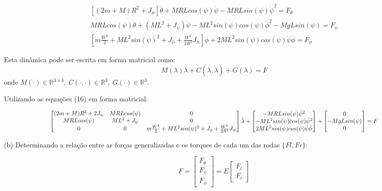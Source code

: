 \documentclass[10pt]{article}
\begin{document}
\begin{equation}
\begin{gathered}
    \left[(2m + M)R^2 + J_w\right] \ddot{\theta} + MRLcos(\psi)\ddot{\psi} - MRLsin(\psi)\dot{\psi}^2 = F_{\theta} \\
    MRLcos(\psi)\ddot{\theta} + (ML^2 + J_\psi)\ddot{\psi} - ML^2sin(\psi)cos(\psi)\dot{\phi}^2 - MgLsin(\psi) = F_{\psi} \\
    \left[m\frac{W^2}{2} + ML^2sin(\psi)^2 + J_{\phi} + \frac{W^2}{2R^2} J_w \right]\ddot{\phi} + 2ML^2sin(\psi)cos(\psi)\dot{\psi}\dot{\phi} = F_{\phi}
\end{gathered}
\end{equation}

\quad Esta dinâmica pode ser escrita em forma matricial como:
\begin{equation}
    M(\lambda) \ddot{\lambda} + C(\lambda, \dot{\lambda}) + G(\lambda) = F
\end{equation}
onde $M(\cdot) \in \mathbb{R}^{3 \times 3}, \ C(\cdot, \cdot) \in \mathbb{R}^3, \ G(\cdot) \in \mathbb{R}^3$.

\quad Utilizando as equações (16) em forma matricial:

\begin{equation}
    \scalebox{0.85}{$
    \begin{bmatrix}
        (2m + M)R^2 + 2J_w & MRLcos(\psi) & 0 \\
        MRLcos(\psi) & ML^2 + J_\psi & 0 \\
        0 & 0 & m\frac{W^2}{2}+ML^2sin(\psi)^2+J_{\phi}+\frac{W^2}{2R^2}J_w
    \end{bmatrix} \ddot{\lambda}+
    \begin{bmatrix}
        - MRLsin(\psi)\dot{\psi}^2 \\
        - ML^2sin(\psi)cos(\psi)\dot{\psi}^2 \\
        2ML^2sin(\psi)cos(\psi)\dot\psi\dot\phi
    \end{bmatrix} +
    \begin{bmatrix}
        0 \\
        - MgLsin(\psi) \\
        0
    \end{bmatrix} = F
    $}
\end{equation}

\quad (b) Determinando a relação entre as forças generalizadas e os torques de
cada um das rodas $\{Fl,Fr\}$:

\begin{equation}
    F =
    \begin{bmatrix}
        F_{\theta} \\
        F_{\psi} \\
        F_{\phi}
    \end{bmatrix} = E
    \begin{bmatrix}
        F_l \\
        F_r
    \end{bmatrix}
\end{equation}
\end{document}
